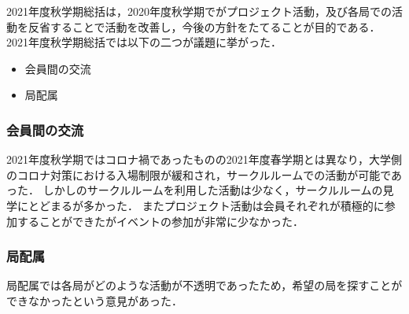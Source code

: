 
2021年度秋学期\firstGrade{}総括は，2020年度秋学期で\firstGrade{}がプロジェクト活動，及び各局での活動を反省することで活動を改善し，今後の方針をたてることが目的である．
2021年度秋学期\firstGrade{}総括では以下の二つが議題に挙がった．
\begin{itemize}
    \item 会員間の交流
    \item 局配属
\end {itemize}

\subsubsection*{会員間の交流}
2021年度秋学期ではコロナ禍であったものの2021年度春学期とは異なり，大学側のコロナ対策における入場制限が緩和され，サークルルームでの活動が可能であった．
しかし\firstGrade{}のサークルルームを利用した活動は少なく，サークルルームの見学にとどまる\firstGrade{}が多かった．
またプロジェクト活動は会員それぞれが積極的に参加することができたがイベントの参加が非常に少なかった．

\subsubsection*{局配属}
局配属では各局がどのような活動が不透明であったため，希望の局を探すことができなかったという意見があった．
